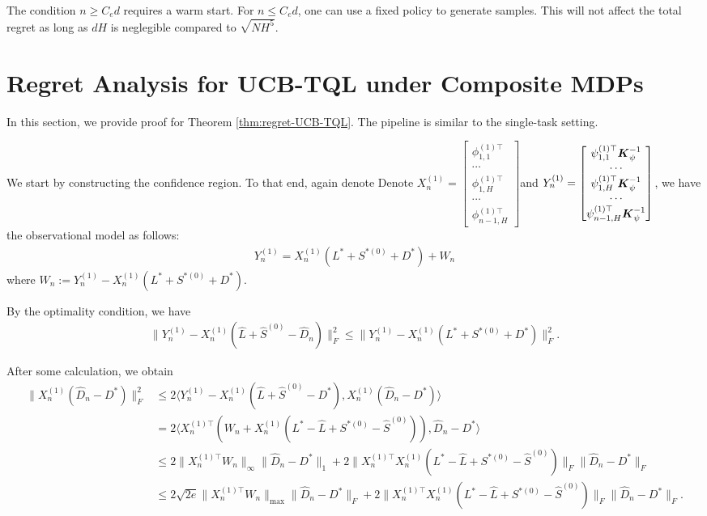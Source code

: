 \begin{remark}
The condition $n\ge C_e d$ requires a warm start. For $n\le C_e d$, one can use a fixed policy to generate samples. This will not affect the total regret as long as $dH$ is neglegible compared to $\sqrt{NH^5}$.
\end{remark}

\section{Regret Analysis for UCB-TQL under Composite MDPs}

In this section, we provide proof for Theorem \ref{thm:regret-UCB-TQL}. The pipeline is similar to the single-task setting.

We start by constructing the confidence region.
To that end, again denote
Denote $X_n^{(1)}=\begin{bmatrix}
\phi_{1,1}^{(1)\top}\\\cdots\\\phi_{1,H}^{(1)\top}\\\cdots\\\phi^{(1)\top}_{n-1,H}
\end{bmatrix}$and $Y_n^{(1)}=\begin{bmatrix}
\psi_{1,1}^{(1)\top}  \boldsymbol{K}_{\psi}^{-1}\\\cdots\\\psi_{1,H}^{(1)\top}  \boldsymbol{K}_{\psi}^{-1}\\\cdots\\\psi_{n-1,H}^{(1)\top} \boldsymbol{K}_{\psi}^{-1}
\end{bmatrix}$, we have the observational model as follows:
\begin{align*}
Y_n^{(1)}=X_n^{(1)}(L^*+S^{*(0)}+D^*)+W_n
\end{align*}
where $W_n:=Y_n^{(1)}-X_n^{(1)}(L^*+S^{*(0)}+D^*)$.

By the optimality condition, we have 
\begin{align*}
\|Y_n^{(1)}-X_n^{(1)}(\hat L+\hat S^{(0)}-\hat D_n)\|_F^2\le \|Y_n^{(1)}-X_n^{(1)}(L^*+S^{*(0)}+D^*)\|_F^2.
\end{align*}

After some calculation, we obtain
\begin{align*}
\|X_n^{(1)}(\hat D_n-D^*)\|_F^2&\le 2\Big\langle Y_n^{(1)}-X_n^{(1)}(\hat L+\hat S^{(0)}-D^*),X_n^{(1)}(\hat D_n-D^*)\Big\rangle\\
&=2\Big\langle  
X_n^{(1)\top}\left(W_n+X_n^{(1)}(L^*-\hat L+S^{*(0)}-\hat S^{(0)})\right),\hat D_n-D^*
\Big\rangle\\&\le
2\Big\| 
X_n^{(1)\top}W_n
\Big\|_\infty \Big\|\hat D_n-D^*\Big\|_1+2\Big\|X_n^{(1)\top}X_n^{(1)}(L^*-\hat L+S^{*(0)}-\hat S^{(0)})\Big\|_F\Big\|\hat D_n-D^*\Big\|_F\\&\le
2\sqrt{2e}\Big\| 
X_n^{(1)\top}W_n
\Big\|_{\max} \Big\|\hat D_n-D^*\Big\|_F+2\Big\|X_n^{(1)\top}X_n^{(1)}(L^*-\hat L+S^{*(0)}-\hat S^{(0)})\Big\|_F\Big\|\hat D_n-D^*\Big\|_F.
\end{align*}

